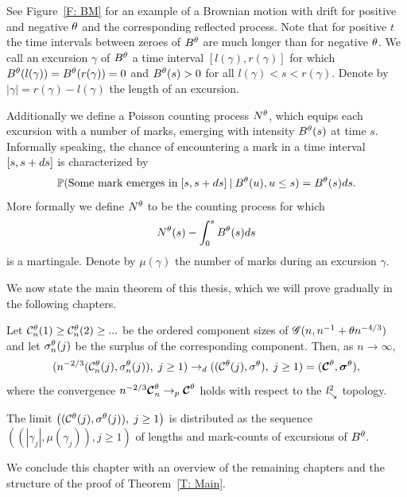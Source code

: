 See Figure~\ref{F: BM} for an example of a Brownian motion with drift for positive and negative $\theta$ and the corresponding reflected process.
Note that for positive $t$ the time intervals between zeroes of $B^{\theta}$ are much longer than for negative $\theta$.
We call an excursion $\gamma$ of $B^{\theta}$ a time interval $[l(\gamma), r(\gamma)]$ for which $B^{\theta}(l(\gamma)) = B^{\theta}(r(\gamma)) = 0$
and $B^{\theta}(s) > 0$ for all $l(\gamma) < s < r(\gamma)$.
Denote by $|\gamma| = r(\gamma) - l(\gamma)$ the length of an excursion.

Additionally we define a Poisson counting process $N^{\theta}$, 
which equips each excursion with a number of marks,
emerging with intensity $B^{\theta}(s)$ at time $s$.
Informally speaking, the chance of encountering a mark in a time interval $[s, s+ds]$ is characterized by
\begin{equation}
	\mathbb{P}( \text{Some mark emerges in} \; [s, s+ds] \: | \: B^{\theta}(u), u \leq s ) = B^{\theta}(s)ds.
\end{equation}
More formally we define $N^{\theta}$ to be the counting process for which
\begin{equation}
	N^{\theta}(s) - \int_{0}^{s} B^{\theta}(s)ds
\end{equation}
is a martingale.
Denote by $\mu(\gamma)$ the number of marks during an excursion $\gamma$.

We now state the main theorem of this thesis, which we will prove gradually in the following chapters.
\begin{theorem} \label{T: Main}
	Let 
	$\mathcal{C}^{\theta}_n(1) \geq \mathcal{C}^{\theta}_n(2) \geq ... $ 
	be the ordered component sizes of 
	$\mathscr{G}(n, n^{-1} + \theta n^{-4/3})$
	and let
	$\mathcal{\sigma}^{\theta}_n(j)$ 
	be the surplus of the corresponding component.
	Then, as $n \rightarrow \infty$,
	\begin{equation}
	( n^{-2 / 3} ( \mathcal{C}^{\theta}_n(j), \mathcal{\sigma}^{\theta}_n(j) ), \; j \geq 1 ) 
	\rightarrow_d
	( (\mathcal{C}^{\theta}(j), \mathcal{\sigma}^{\theta}), \; j \geq 1 )
	= ( \boldsymbol{\mathcal{C}}^{\theta}, \boldsymbol{\mathcal{\sigma}}^{\theta} ),
	\end{equation}
	where the convergence 
	$n^{-2 / 3} \boldsymbol{\mathcal{C}}^{\theta}_n \rightarrow_p \boldsymbol{\mathcal{C}}^{\theta}$
	holds with respect to the $\mathit{l}^2_{\searrow}$ topology.
	
	The limit
	$\left( ( \mathcal{C}^{\theta}(j), \mathcal{\sigma}^{\theta}(j) ), \; j \geq 1 \right)$
	is distributed as the sequence
	$ \left( (|\gamma_j|, \mu(\gamma_j)), j \geq 1  \right) $
	of lengths and mark-counts of excursions of $B^{\theta}$.
\end{theorem}

We conclude this chapter with an overview of the remaining chapters and the structure of the proof of Theorem~\ref{T: Main}.


